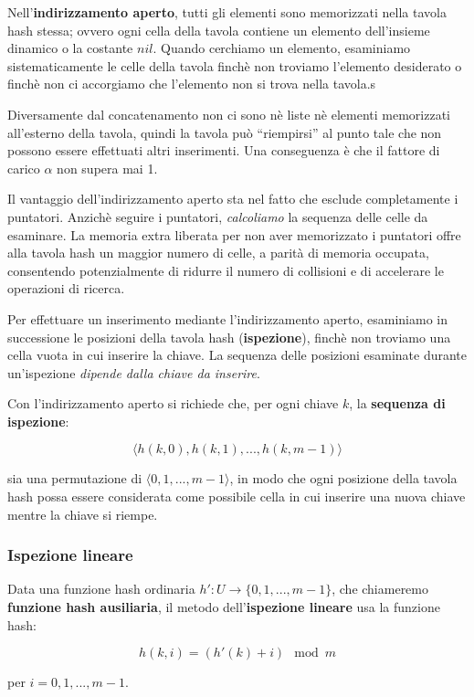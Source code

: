 Nell'\textbf{indirizzamento aperto}, tutti gli elementi sono memorizzati nella tavola hash stessa; ovvero ogni cella della tavola contiene un elemento dell'insieme dinamico o la costante $nil$. Quando cerchiamo un elemento, esaminiamo sistematicamente le celle della tavola finchè non troviamo l'elemento desiderato o finchè non ci accorgiamo che l'elemento non si trova nella tavola.s

Diversamente dal concatenamento non ci sono nè liste nè elementi memorizzati all'esterno della tavola, quindi la tavola può ``riempirsi'' al punto tale che non possono essere effettuati altri inserimenti. Una conseguenza è che il fattore di carico $\alpha$ non supera mai 1.

Il vantaggio dell'indirizzamento aperto sta nel fatto che esclude completamente i puntatori. Anzichè seguire i puntatori, \textit{calcoliamo} la sequenza delle celle da esaminare. La memoria extra liberata per non aver memorizzato i puntatori offre alla tavola hash un maggior numero di celle, a parità di memoria occupata, consentendo potenzialmente di ridurre il numero di collisioni e di accelerare le operazioni di ricerca.

Per effettuare un inserimento mediante l'indirizzamento aperto, esaminiamo in successione le posizioni della tavola hash (\textbf{ispezione}), finchè non troviamo una cella vuota in cui inserire la chiave. La sequenza delle posizioni esaminate durante un'ispezione \textit{dipende dalla chiave da inserire}.

Con l'indirizzamento aperto si richiede che, per ogni chiave $k$, la \textbf{sequenza di ispezione}:

$$\langle h(k,0),h(k,1),...,h(k,m-1)\rangle$$

sia una permutazione di $\langle 0,1,...,m-1\rangle$, in modo che ogni posizione della tavola hash possa essere considerata come possibile cella in cui inserire una nuova chiave mentre la chiave si riempe.

\subsubsection{Ispezione lineare}

Data una funzione hash ordinaria $h':U\to \{0,1,...,m-1\}$, che chiameremo \textbf{funzione hash ausiliaria}, il metodo dell'\textbf{ispezione lineare} usa la funzione hash:

$$h(k,i)=(h'(k)+i)\mod m$$

per $i=0,1,...,m-1$.

